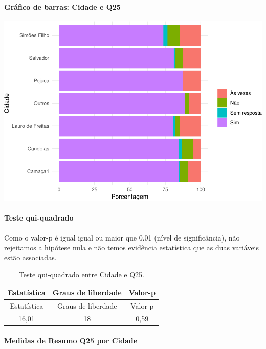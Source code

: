 \documentclass[]{article}
\let\oldparagraph\paragraph
\renewcommand{\paragraph}[1]{\oldparagraph{#1}\mbox{}}
\begin{document}
\hypertarget{gruxe1fico-de-barras-cidade-e-q25}{%
\paragraph{Gráfico de barras: Cidade e Q25}\label{gruxe1fico-de-barras-cidade-e-q25}}

\begin{center}\includegraphics[width=0.75\linewidth]{relatorio_covid19_files/figure-latex/unnamed-chunk-662-1} \end{center}

\hypertarget{teste-qui-quadrado-57}{%
\paragraph{Teste qui-quadrado}\label{teste-qui-quadrado-57}}

Como o valor-p é igual igual ou maior que 0.01 (nível de significância), não rejeitamos a hipótese nula e não temos evidência estatística que as duas variáveis estão associadas.

\begin{longtable}[]{@{}ccc@{}}
\caption{\label{tab:unnamed-chunk-664}Teste qui-quadrado entre Cidade e Q25.}\tabularnewline
\toprule
Estatística & Graus de liberdade & Valor-p\tabularnewline
\midrule
\endfirsthead
\toprule
Estatística & Graus de liberdade & Valor-p\tabularnewline
\midrule
\endhead
16,01 & 18 & 0,59\tabularnewline
\bottomrule
\end{longtable}

\cleardoublepage

\hypertarget{medidas-de-resumo-q25-por-cidade}{%
\paragraph{Medidas de Resumo Q25 por Cidade}\label{medidas-de-resumo-q25-por-cidade}}
\end{document}
